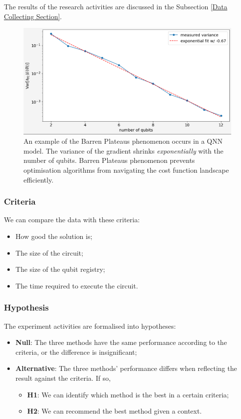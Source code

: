 The results of the research activities are discussed in the Subsection \ref{Data Collecting Section}.

\label{Research Activities section}
\begin{figure}
    \includegraphics[width=\textwidth]{./ResearchDesign/Appendices/VarianceShrinking.png}
    \caption{
        An example of the Barren Plateaus phenomenon occurs in a QNN model. 
        The variance of the gradient shrinks \textit{exponentially} with the number of qubits. 
        Barren Plateaus phenomenon prevents optimisation algorithms from navigating the cost function landscape efficiently.
    }
    \label{Variance Shrinking demo}
\end{figure}


\subsubsection{Criteria}
\label{Criteria section}
We can compare the data with these criteria:
\begin{itemize}
    \item How good the solution is;
    \item The size of the circuit;
    \item The size of the qubit registry;
    \item The time required to execute the circuit.
\end{itemize}

\subsubsection{Hypothesis}
The experiment activities are formalised into hypotheses:
\begin{itemize}
    \item \textbf{Null}: The three methods have the same performance according to the criteria, or the difference is insignificant;
    \item \textbf{Alternative}: The three methods' performance differs when reflecting the result against the criteria. If so,
    \begin{itemize}
        \item \textbf{H1}: We can identify which method is the best in a certain criteria;
        \item \textbf{H2}: We can recommend the best method given a context.
    \end{itemize}
\end{itemize}

